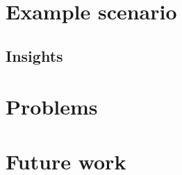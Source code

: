 \documentclass[journal]{vgtc}                %
\begin{document}
\section{Example scenario}
\subsection{Insights}

\section{Problems}

\section{Future work}
 



\end{document}
